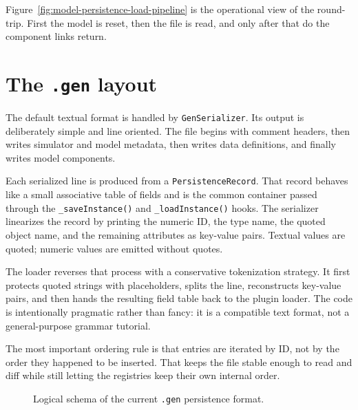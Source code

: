 Figure~\ref{fig:model-persistence-load-pipeline} is the operational view of
the round-trip. First the model is reset, then the file is read, and only after
that do the component links return.

\section{The \texttt{.gen} layout}
\label{sec:model-persistence-gen-layout}

The default textual format is handled by \texttt{GenSerializer}. Its output is
deliberately simple and line oriented. The file begins with comment headers,
then writes simulator and model metadata, then writes data definitions, and
finally writes model components.

Each serialized line is produced from a \texttt{PersistenceRecord}. That record
behaves like a small associative table of fields and is the common container
passed through the \texttt{\_saveInstance()} and \texttt{\_loadInstance()} hooks.
The serializer linearizes the record by printing the numeric ID, the type name,
the quoted object name, and the remaining attributes as key-value pairs.
Textual values are quoted; numeric values are emitted without quotes.

The loader reverses that process with a conservative tokenization strategy. It
first protects quoted strings with placeholders, splits the line, reconstructs
key-value pairs, and then hands the resulting field table back to the plugin
loader. The code is intentionally pragmatic rather than fancy: it is a
compatible text format, not a general-purpose grammar tutorial.

The most important ordering rule is that entries are iterated by ID, not by the
order they happened to be inserted. That keeps the file stable enough to read
and diff while still letting the registries keep their own internal order.

\begin{figure}[htbp]
\centering
\caption{Logical schema of the current \texttt{.gen} persistence format.}
\label{fig:model-persistence-gen-schema}
\end{figure}

